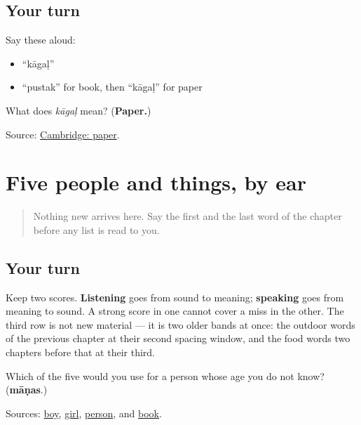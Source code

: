 \subsection*{Your turn}
Say these aloud:

\begin{itemize}
\raggedright
  \item \textquotedblleft{}kāgaḷ\textquotedblright{}
  \item \textquotedblleft{}pustak\textquotedblright{} for book, then \textquotedblleft{}kāgaḷ\textquotedblright{} for paper
\end{itemize}

\begin{tcolorbox}[breakable,colback=teal!4,colframe=teal!35!black,title={Before you move on}]
What does \emph{kāgaḷ} mean? (\textbf{Paper.})

Source: \href{https://dictionary.cambridge.org/dictionary/english-gujarati/paper}{Cambridge: paper}.
\end{tcolorbox}
\section[Practice]{Five people and things, by ear}

\label{lesson:GU-C30-people-five}



\begin{quote}
Nothing new arrives here. Say the first and the last word of the chapter before any list is read to you.
\end{quote}

\subsection*{Your turn}
Keep two scores. \textbf{Listening} goes from sound to meaning; \textbf{speaking} goes from meaning to sound. A strong score in one cannot cover a miss in the other. The third row is not new material — it is two older bands at once: the outdoor words of the previous chapter at their second spacing window, and the food words two chapters before that at their third.

\begin{tcolorbox}[breakable,colback=teal!4,colframe=teal!35!black,title={Before you move on}]
Which of the five would you use for a person whose age you do not know? (\textbf{māṇas}.)

Sources: \href{https://dictionary.cambridge.org/dictionary/english-gujarati/boy}{boy}, \href{https://dictionary.cambridge.org/dictionary/english-gujarati/girl}{girl}, \href{https://dictionary.cambridge.org/dictionary/english-gujarati/person}{person}, and \href{https://dictionary.cambridge.org/dictionary/english-gujarati/book}{book}.
\end{tcolorbox}
